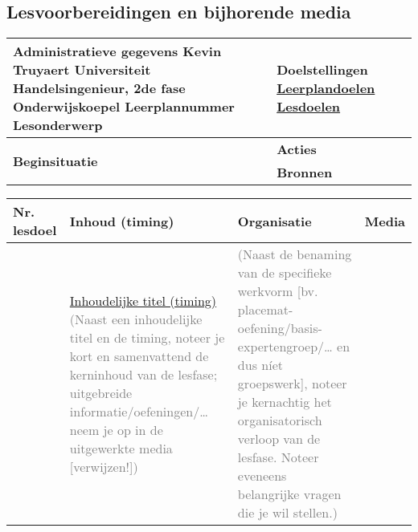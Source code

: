 


\begin{landscape}
	\section{Lesvoorbereidingen en bijhorende media}
	\begin{tabularx}{1.56\textwidth}{|p{}|X|}\hline
		\textbf{Administratieve gegevens}\newline\newline
		Kevin Truyaert\newline\newline
		Universiteit\newline
		Handelsingenieur, 2de fase\newline
		Onderwijskoepel\newline
		Leerplannummer\newline
		Lesonderwerp & \textbf{Doelstellingen}\newline\newline
		\underline{Leerplandoelen}\newline\newline
		\underline{Lesdoelen}\newline\newline \\\hline
		\multirow{2}{0.35\textwidth}{\textbf{Beginsituatie}} & \textbf{Acties} \\ \cline{2-2}
		 & \textbf{Bronnen}\\\hline
		
	\end{tabularx}
	
	
	
\begin{table}[h]
	\begin{tabularx}{1.56\textwidth}{|p{1.5cm}|p{6cm}|X|p{4cm}|}
		\hline
		\textbf{Nr. lesdoel } & \textbf{Inhoud (timing)}  & \textbf{Organisatie } & \textbf{Media } \\ \hline
		&\underline{Inhoudelijke titel (timing)}
	    \textcolor{gray}{(Naast een inhoudelijke titel en de timing, noteer je kort en samenvattend de kerninhoud van de lesfase; uitgebreide informatie/oefeningen/… neem je op in de uitgewerkte media [verwijzen!])}
	    &  \textcolor{gray}{(Naast de benaming van de specifieke werkvorm [bv. placemat-oefening/basis-expertengroep/… en dus níet groepswerk], noteer je kernachtig het organisatorisch verloop van de lesfase. Noteer eveneens belangrijke vragen die je wil stellen.) }
		& 
		\\ \hline
	\end{tabularx}
\end{table}		
	
	
	
	
	
	
	
	
\end{landscape}